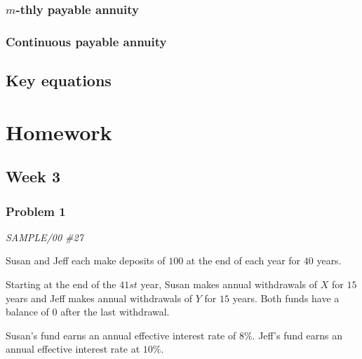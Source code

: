 \documentclass[
]{book}
\begin{document}
\hypertarget{m-thly-payable-annuity}{%
\subsection*{\texorpdfstring{\(m\)-thly payable annuity}{m-thly payable annuity}}\label{m-thly-payable-annuity}}

\hypertarget{continuous-payable-annuity}{%
\subsection*{Continuous payable annuity}\label{continuous-payable-annuity}}

\hypertarget{key-equations}{%
\section{Key equations}\label{key-equations}}

\hypertarget{homework}{%
\chapter*{Homework}\label{homework}}

\hypertarget{week-3}{%
\section*{Week 3}\label{week-3}}

\hypertarget{problem-1}{%
\subsection*{Problem 1}\label{problem-1}}

\emph{SAMPLE/00 \#27}

Susan and Jeff each make deposits of \(100\) at the end of each year for \(40\) years.

Starting at the end of the \(41st\) year, Susan makes annual withdrawals of \(X\) for \(15\) years and Jeff makes annual withdrawals of \(Y\) for \(15\) years. Both funds have a balance of \(0\) after the last withdrawal.

Susan's fund earns an annual effective interest rate of \(8\%\). Jeff's fund earns an annual effective interest rate at \(10\%\).
\end{document}
